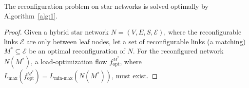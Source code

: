 \documentclass[sigconf]{acmart}
\newcommand{\E}{\mathcal{E}}  %
\newcommand\klaus[1]{\color{olive}\textbf{Klaus: #1}\color{black}}
\begin{document}
\begin{theorem}\label{thm:opt1}
The reconfiguration problem on star networks is solved optimally by Algorithm~\ref{alg:1}.
\end{theorem}
\begin{proof}
Given a  hybrid star network $N=(V,E,S,\E)$, where the reconfigurable links $\E$ are only between leaf nodes, let a set of reconfigurable links (a matching) $M^{*}\subseteq \E$ be an optimal reconfiguration of $N$. 
%
For the reconfigured network $N\left( M^*\right) $, a load-optimization flow $f^{M^*}_{\text{opt}}$, where $L_{\text{max}}\left( f^{M^*}_{\text{opt}}\right) =L_{\text{min-max}}\left( N\left( M^*\right) \right)$, must exist. 
%

\end{proof}
\end{document}

